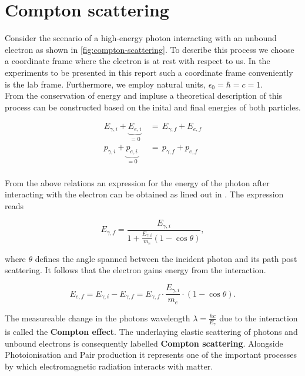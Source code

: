 
\section{Compton scattering}
\label{sec:compton-scattering}

Consider the scenario of a high-energy photon interacting with an unbound electron as
shown in \autoref{fig:compton-scattering}. To describe this process we choose a
coordinate frame where the electron is at rest with respect to us. In the experiments
to be presented in this report such a coordinate frame conveniently is the lab frame.
Furthermore, we employ natural units, $\epsilon_0=\hbar=c=1$. \\
From the conservation of energy and impluse a theoretical description of this process
can be constructed based on the inital and final energies of both particles.

\begin{align*}
E_{\gamma,i} + \underbrace{E_{e,i}}_{=0}\,&=\,E_{\gamma,f}+E_{e,f} \\
p_{\gamma,i} + \underbrace{p_{e,i}}_{=0}\,&=\,p_{\gamma,f}+p_{e,f} \\
\end{align*}

From the above relations an expression for the energy of the photon after interacting
with the electron can be obtained as lined out in \cite{Sch17}. The expression reads

\begin{equation}
\label{eq:photon-energy}
E_{\gamma,f}=\frac{E_{\gamma,i}}{1+\frac{E_{\gamma,i}}{m_e}(1-\cos\theta)},
\end{equation}

where $\theta$ defines the angle spanned between the incident photon and its path
post scattering. It follows that the electron gains energy from the interaction.

\begin{equation}
\label{eq:electron-energy}
E_{e,f}=E_{\gamma,i}-E_{\gamma,f}=E_{\gamma,f}\cdot\frac{E_{\gamma,i}}{m_e}\cdot(1-\cos\theta).
\end{equation}

The measureable change in the photons wavelength $\lambda=\frac{hc}{E_{\gamma}}$
due to the interaction is called the \textbf{Compton effect}. The underlaying elastic
scattering of photons and unbound electrons is consequently labelled \textbf{Compton
scattering}. Alongside Photoionisation and Pair production it represents one of the
important processes by which electromagnetic radiation interacts with matter.

